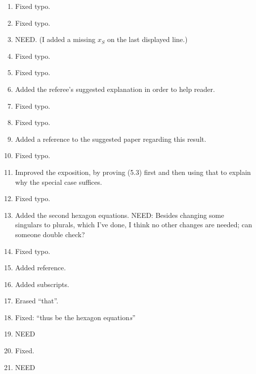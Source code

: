 \documentclass{amsart}
\begin{document}
\begin{enumerate}
\item Fixed typo.

\item Fixed typo.

\item NEED. (I added a missing $x_S$ on the last displayed line.)

\item Fixed typo.

\item Fixed typo.

\item Added the referee's suggested explanation in order to help reader. 

\item Fixed typo.

\item Fixed typo.

\item Added a reference to the suggested paper regarding this result.
\item Fixed typo.

\item Improved the exposition, by proving (5.3) first and then using that to explain why the special case suffices.

\item Fixed typo.

\item Added the second hexagon equations. NEED: Besides changing some singulars to plurals, which I've done, I think no other changes are needed; can someone double check?

\item Fixed typo.

\item Added reference. 

\item Added subscripts.

\item Erased ``that''. 

\item Fixed: ``thus be the hexagon equation\emph{s}''

\item NEED

\item Fixed.

\item NEED

\end{enumerate}
\end{document}

